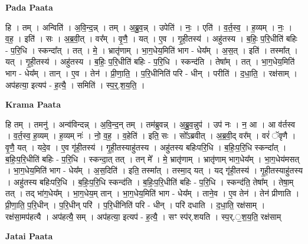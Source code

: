 \documentclass[17pt]{extarticle}
\begin{document}
\textbf{Pada Paata} \newline

हि । तम् । अन्विति॑ । अ॒वि॒न्द॒न्न् । तम् । अ॒ब्रु॒व॒न्न् । उपेति॑ । नः॒ । एति॑ । व॒र्त॒स्व॒ । ह॒व्यम् । नः॒ । व॒ह॒ । इति॑ । सः । अ॒ब्र॒वी॒त् । वर᳚म् । वृ॒णै॒ । यत् । ए॒व । गृ॒ही॒तस्य॑ । अहु॑तस्य । ब॒हिः॒ प॒रि॒धीति॑ बहिः - प॒रि॒धि । स्कन्दा᳚त् । तत् । मे॒ । भ्रातृ॑णाम् । भा॒ग॒धेय॒मिति॑ भाग - धेय᳚म् । अ॒स॒त् । इति॑ । तस्मा᳚त् । यत् । गृ॒ही॒तस्य॑ । अहु॑तस्य । ब॒हिः॒ प॒रि॒धीति॑ बहिः - प॒रि॒धि । स्कन्द॑ति । तेषा᳚म् । तत् । भा॒ग॒धेय॒मिति॑ भाग - धेय᳚म् । तान् । ए॒व । तेन॑ । प्री॒णा॒ति॒ । प॒रि॒धीनिति॑ परि - धीन् । परीति॑ । द॒धा॒ति॒ । रक्ष॑साम् । अप॑हत्या॒ इत्यप॑ - ह॒त्यै॒ । समिति॑ । स्प॒र्॒.श॒य॒ति॒ ।  \newline


\textbf{Krama Paata} \newline

हि तम् । तमनु॑ । अन्व॑विन्दन्न् । अ॒वि॒न्द॒न् तम् । तम॑ब्रुवन्न् । अ॒ब्रु॒व॒न्नुप॑ । उप॑ नः । न॒ आ । आ व॑र्तस्व । व॒र्त॒स्व॒ ह॒व्यम् । ह॒व्यम् नः॑ । नो॒ व॒ह॒ । व॒हेति॑ । इति॒ सः । सो᳚ऽब्रवीत् । अ॒ब्र॒वी॒द् वर᳚म् । वरं॑ ॅवृणै । वृ॒णै॒ यत् । यदे॒व । ए॒व गृ॑ही॒तस्य॑ । गृ॒ही॒तस्याहु॑तस्य । अहु॑तस्य बहिःपरि॒धि । ब॒हिः॒प॒रि॒धि स्कन्दा᳚त् । ब॒हिः॒प॒रि॒धीति॑ बहिः - प॒रि॒धि । स्कन्दा॒त् तत् । तन् मे᳚ । मे॒ भ्रातृ॑णाम् । भ्रातृ॑णाम् भाग॒धेय᳚म् । भा॒ग॒धेय॑मसत् । भा॒ग॒धेय॒मिति॑ भाग - धेय᳚म् । अ॒स॒दिति॑ । इति॒ तस्मा᳚त् । तस्मा॒द् यत् । यद् गृ॑ही॒तस्य॑ । गृ॒ही॒तस्याहु॑तस्य । अहु॑तस्य बहिःपरि॒धि । ब॒हिः॒प॒रि॒धि स्कन्द॑ति । ब॒हिः॒प॒रि॒धीति॑ बहिः - प॒रि॒धि । स्कन्द॑ति॒ तेषा᳚म् । तेषा॒म् तत् । तद् भा॑ग॒धेय᳚म् । भा॒ग॒धेय॒म् तान् । भा॒ग॒धेय॒मिति॑ भाग - धेय᳚म् । ताने॒व । ए॒व तेन॑ । तेन॑ प्रीणाति । प्री॒णा॒ति॒ प॒रि॒धीन् । प॒रि॒धीन् परि॑ । प॒रि॒धीनिति॑ परि - धीन् । परि॑ दधाति । द॒धा॒ति॒ रक्ष॑साम् । रक्ष॑सा॒मप॑हत्यै । अप॑हत्यै॒ सम् । अप॑हत्या॒ इत्यप॑ - ह॒त्यै॒ । सꣳ स्प॑र्.शयति । स्प॒र्.॒श॒य॒ति॒ रक्ष॑साम् \newline

\textbf{Jatai Paata} \newline
\end{document}
